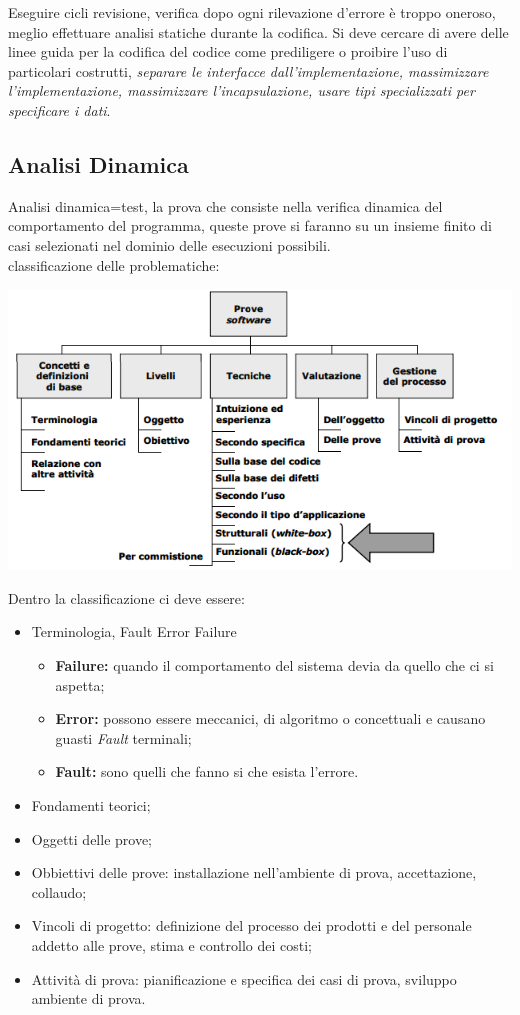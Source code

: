 Eseguire cicli revisione, verifica dopo ogni rilevazione d'errore è troppo oneroso, meglio effettuare analisi statiche durante la codifica. Si deve cercare di avere delle linee guida per la codifica del codice come prediligere o proibire l'uso di particolari costrutti, \textit{separare le interfacce dall'implementazione, massimizzare l'implementazione, massimizzare l'incapsulazione, usare tipi specializzati per specificare i dati}.

\subsection{Analisi Dinamica}

Analisi dinamica=test, la prova che consiste nella verifica dinamica del comportamento del programma, queste prove si faranno su un insieme finito di casi selezionati nel dominio delle esecuzioni possibili.\\

classificazione delle problematiche:

\includegraphics[width=0.5\columnwidth]{img6} %

Dentro la classificazione ci deve essere:

\begin{itemize}
	\item Terminologia, Fault \rightarrow Error \rightarrow Failure
	\begin{itemize}
		\item \textbf{Failure:} quando il comportamento del sistema devia da quello che ci si aspetta;
		\item \textbf{Error:} possono essere meccanici, di algoritmo o concettuali e causano guasti \textit{Fault} terminali;
		\item \textbf{Fault:} sono quelli che fanno si che esista l'errore.
	\end{itemize}
	\item Fondamenti teorici;
	\item Oggetti delle prove;
	\item Obbiettivi delle prove: installazione nell'ambiente di prova, accettazione, collaudo;
	\item Vincoli di progetto: definizione del processo dei prodotti e del personale addetto alle prove, stima e controllo dei costi;
	\item Attività di prova: pianificazione e specifica dei casi di prova, sviluppo ambiente di prova.
\end{itemize}




